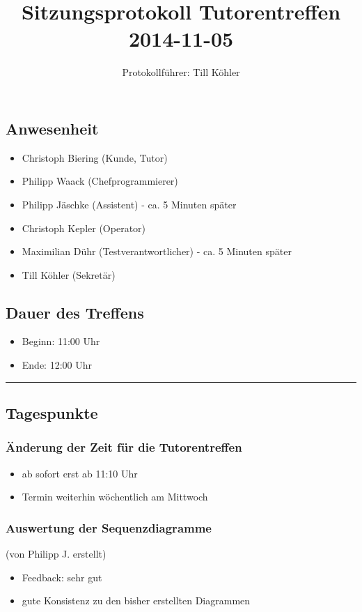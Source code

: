 \documentclass[12pt,a4paper]{article}
\author{Protokollführer: Till Köhler}
\title{Sitzungsprotokoll Tutorentreffen 2014-11-05}
\date{}
\begin{document}
\maketitle

\subsection*{Anwesenheit}
\medskip
\begin{itemize}
\item Christoph Biering (Kunde, Tutor)
\item Philipp Waack (Chefprogrammierer)
\item Philipp Jäschke (Assistent) - ca. 5 Minuten später
\item Christoph Kepler (Operator)
\item Maximilian Dühr (Testverantwortlicher) - ca. 5 Minuten später
\item Till Köhler (Sekretär)
\end{itemize}

\subsection*{Dauer des Treffens}
\medskip
\begin{itemize}
\item Beginn: 11:00 Uhr
\item Ende: 12:00 Uhr
\end{itemize}

\noindent\rule{\textwidth}{1pt}

\subsection*{Tagespunkte}
\medskip

\subsubsection*{Änderung der Zeit für die Tutorentreffen}
\begin{itemize}
\item ab sofort erst ab 11:10 Uhr
\item Termin weiterhin wöchentlich am Mittwoch
\end{itemize}

\subsubsection*{Auswertung der Sequenzdiagramme}
(von Philipp J. erstellt)
\begin{itemize}
\item Feedback: sehr gut
\item gute Konsistenz zu den bisher erstellten Diagrammen
\end{itemize}
\end{document}
